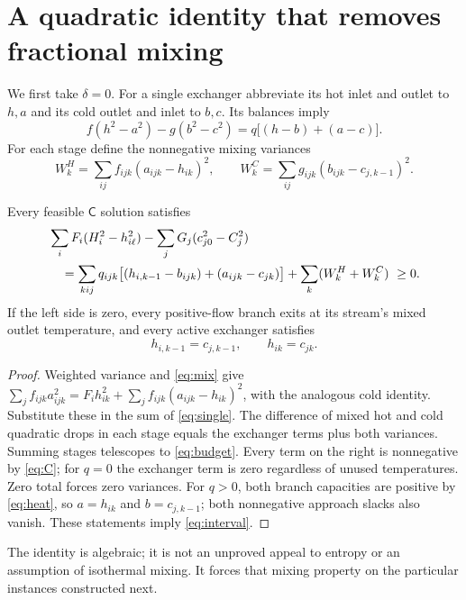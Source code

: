 \documentclass[11pt,a4paper]{report}
\newcommand{\CC}{\mathsf{C}}
\begin{document}
\section{A quadratic identity that removes fractional mixing}
We first take $\delta=0$. For a single exchanger abbreviate its hot inlet and
outlet to $h,a$ and its cold outlet and inlet to $b,c$. Its balances imply
\begin{equation}\label{eq:single}
 f(h^2-a^2)-g(b^2-c^2)=q\bigl[(h-b)+(a-c)\bigr].
\end{equation}
For each stage define the nonnegative mixing variances
\begin{equation}\label{eq:var}
 W^H_k=\sum_{ij}f_{ijk}(a_{ijk}-h_{ik})^2,\qquad
 W^C_k=\sum_{ij}g_{ijk}(b_{ijk}-c_{j,k-1})^2.
\end{equation}
\begin{lemma}[note=Quadratic budget and equality case]\label{lem:quad}
Every feasible $\CC$ solution satisfies
\begin{align}
 &\sum_i F_i(H_i^2-h_{i\ell}^2)
 -\sum_j G_j(c_{j0}^2-C_j^2)\notag\\
 &\quad=\sum_{kij}q_{ijk}
 \bigl[(h_{i,k-1}-b_{ijk})+(a_{ijk}-c_{jk})\bigr]
 +\sum_k(W^H_k+W^C_k)\ \geq0.\label{eq:budget}
\end{align}
If the left side is zero, every positive-flow branch exits at its stream's
mixed outlet temperature, and every active exchanger satisfies
\begin{equation}\label{eq:interval}
 h_{i,k-1}=c_{j,k-1},\qquad h_{ik}=c_{jk}.
\end{equation}
\end{lemma}
\begin{proof}
Weighted variance and \eqref{eq:mix} give
$\sum_j f_{ijk}a_{ijk}^2=F_i h_{ik}^2+
\sum_j f_{ijk}(a_{ijk}-h_{ik})^2$, with the analogous cold identity.
Substitute these in the sum of \eqref{eq:single}. The difference of mixed
hot and cold quadratic drops in each stage equals the exchanger terms plus
both variances. Summing stages telescopes to \eqref{eq:budget}.
Every term on the right is nonnegative by \eqref{eq:C}; for $q=0$ the
exchanger term is zero regardless of unused temperatures. Zero total forces
zero variances. For $q>0$, both branch capacities are positive by
\eqref{eq:heat}, so $a=h_{ik}$ and $b=c_{j,k-1}$; both nonnegative approach
slacks also vanish. These statements imply \eqref{eq:interval}.
\end{proof}
The identity is algebraic; it is not an unproved appeal to entropy or an
assumption of isothermal mixing. It forces that mixing property on the
particular instances constructed next.
\end{document}
